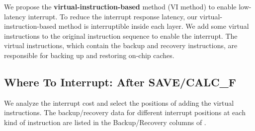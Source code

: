 
We propose the \textbf{virtual-instruction-based} method (VI method) to enable low-latency interrupt. 
To reduce the interrupt response latency, our virtual-instruction-based method is interruptible inside each layer. We add some virtual instructions to the original instruction sequence to enable the interrupt.
The virtual instructions, which contain the backup and recovery instructions, are responsible for backing up and restoring on-chip caches. 




\subsection{ Where To Interrupt: After SAVE/CALC\_F }
\label{sec:whereinter}
We analyze the interrupt cost and select the positions of adding the virtual instructions.
The backup/recovery data for different interrupt positions at each kind of instruction are listed in the Backup/Recovery columns of .

